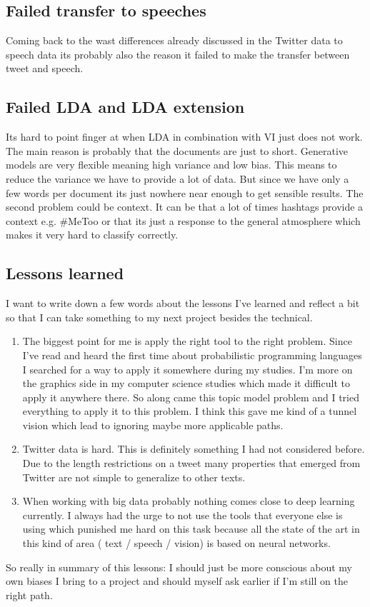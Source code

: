 \documentclass[10pt,conference,compsocconf]{IEEEtran}
\begin{document}
\subsection{Failed transfer to speeches}
Coming back to the wast differences already discussed in the Twitter data to speech data its probably also the reason it failed to make the transfer between tweet and speech. 

\subsection{Failed LDA and LDA extension}
Its hard to point finger at when LDA in combination with VI just does not work. The main reason is probably that the documents are just to short. Generative models are very flexible meaning high variance and low bias. This means to reduce the variance we have to provide a lot of data. But since we have only a few words per document its just nowhere near enough to get sensible results. The second problem could be context. It can be that a lot of times hashtags provide a context e.g. \#MeToo or that its just a response to the general atmosphere which makes it very hard to classify correctly.

\subsection{Lessons learned}
I want to write down a few words about the lessons I've learned and reflect a bit so that I can take something to my next project besides the technical. 
\begin{enumerate}
	\item The biggest point for me is apply the right tool to the right problem. Since I've read and heard the first time about probabilistic programming languages I searched for a way to apply it somewhere during my studies. I'm more on the graphics side in my computer science studies which made it difficult to apply it anywhere there. So along came this topic model problem and I tried everything to apply it to this problem. I think this gave me kind of a tunnel vision which lead to ignoring maybe more applicable paths.
	\item Twitter data is hard. This is definitely something I had not considered before. Due to the length restrictions on a tweet many properties that emerged from Twitter are not simple to generalize to other texts. 
	\item When working with big data probably nothing comes close to deep learning currently. I always had the urge to not use the tools that everyone else is using which punished me hard on this task because all the state of the art in this kind of area ( text / speech / vision) is based on neural networks. 
\end{enumerate}
So really in summary of this lessons: I should just be more conscious about my own biases I bring to a project and should myself ask earlier if I'm still on the right path. 
\end{document}
